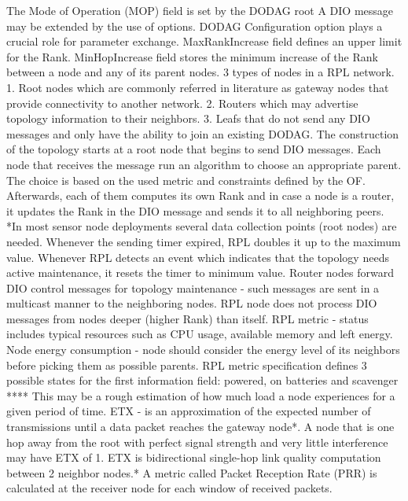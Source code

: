 	The Mode of Operation (MOP) field is set by the DODAG root 
	A DIO message may be extended by the use of options. DODAG Configuration option plays a crucial role for parameter exchange. MaxRankIncrease field defines an upper limit for the Rank. MinHopIncrease field stores the minimum increase of the Rank between a node and any of its parent nodes.
	3 types of nodes in a RPL network. 1. Root nodes which are commonly referred in literature as gateway nodes that provide connectivity to another network. 2. Routers which may advertise topology information to their neighbors. 3. Leafs that do not send any DIO messages and only have the ability to join an existing DODAG. 
	The construction of the topology starts at a root node that begins to send DIO messages. Each node that receives the message run an algorithm to choose an appropriate parent. The choice is based on the used metric and constraints defined by the OF. Afterwards, each of them computes its own Rank and in case a node is a router, it updates the Rank in the DIO message and sends it to all neighboring peers. *In most sensor node deployments several data collection points (root nodes) are needed.
	Whenever the sending timer expired, RPL doubles it up to the maximum value. Whenever RPL detects an event which indicates that the topology needs active maintenance, it resets the timer to minimum value. 
	Router nodes forward DIO control messages for topology maintenance - such messages are sent in a multicast manner to the neighboring nodes. RPL node does not process DIO messages from nodes deeper (higher Rank) than itself. 
	RPL metric - status includes typical resources such as CPU usage, available memory and left energy. Node energy consumption - node should consider the energy level of its neighbors before picking them as possible parents. RPL metric specification defines 3 possible states for the first information field: powered, on batteries and scavenger **** This may be a rough estimation of how much load a node experiences for a given period of time. ETX - is an approximation of the expected number of transmissions until a data packet reaches the gateway node*. A node that is one hop away from the root with perfect signal strength and very little interference may have ETX of 1. ETX is bidirectional single-hop link quality computation between 2 neighbor nodes.* A metric called Packet Reception Rate (PRR) is calculated at the receiver node for each window of received packets.
